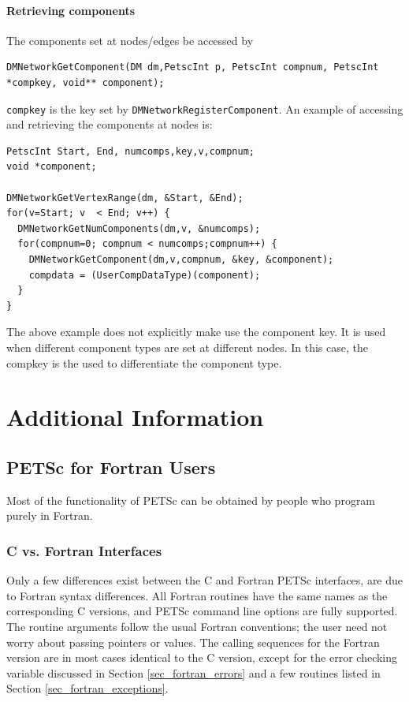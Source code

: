 \subsection{Retrieving components}
The components set at nodes/edges be accessed by
\begin{lstlisting}
DMNetworkGetComponent(DM dm,PetscInt p, PetscInt compnum, PetscInt *compkey, void** component);
\end{lstlisting}
\lstinline{compkey} is the key set by \lstinline{DMNetworkRegisterComponent}. An example of accessing and retrieving the components at nodes is:

\begin{lstlisting}
PetscInt Start, End, numcomps,key,v,compnum; 
void *component;

DMNetworkGetVertexRange(dm, &Start, &End); 
for(v=Start; v  < End; v++) { 
  DMNetworkGetNumComponents(dm,v, &numcomps); 
  for(compnum=0; compnum < numcomps;compnum++) {
    DMNetworkGetComponent(dm,v,compnum, &key, &component); 
    compdata = (UserCompDataType)(component); 
  }
}
\end{lstlisting}
The above example does not explicitly make use the component key. It is used when different component types are set at different nodes. In this case, the {compkey} is the used to differentiate the component type.

\cleardoublepage
\part{Additional Information}
\label{part_usefulstuff}

\cleardoublepage
\chapter{PETSc for Fortran Users}
\label{ch_fortran}

Most of the functionality of PETSc can be obtained by people who
program purely in Fortran.

\section{C vs. Fortran Interfaces}

Only a few differences exist between the C and Fortran PETSc
interfaces, are due to Fortran syntax differences.
All Fortran routines have the same names as the corresponding C
versions, and PETSc command line options are fully supported. The
routine arguments follow the usual Fortran conventions; the user need
not worry about passing pointers or values.  The calling sequences
for the Fortran version are in most cases identical to the C version,
except for the error checking variable discussed in
Section \ref{sec_fortran_errors} and a few routines listed in
Section \ref{sec_fortran_exceptions}.

